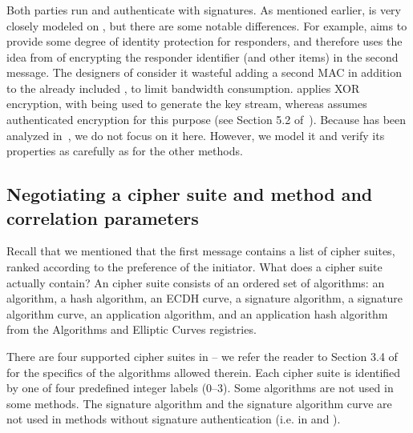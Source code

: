 \subsubsection{\mSigSig}
Both parties run \mSig{} and authenticate with signatures.
%
As mentioned earlier, \mSigSig{} is very closely modeled on \mSigmaI{}, but
there are some notable differences.
%
For example, \mEdhoc{} aims to provide some degree of identity protection for
responders, and therefore uses the idea from \mSigmaI{} of encrypting the
responder identifier \mIdcredr{} (and other items) in the second message.
%
The designers of \mEdhoc{} consider it wasteful adding a second MAC in addition
to the already included \mMactwo{}, to limit bandwidth consumption.
%
\mEdhoc{} applies XOR encryption, with \mHkdf{} being used to generate the
key stream, whereas \mSigma{} assumes authenticated encryption for this
purpose (see Section 5.2 of~\cite{sigma}).
%
Because \mSigSig{} has been analyzed in~\cite{DBLP:conf/secsr/BruniJPS18}, we
do not focus on it here.
%
However, we model it and verify its properties as carefully as for the other methods.


\subsection{Negotiating a cipher suite and method and correlation parameters}
\label{sec:ciphersuite}
Recall that we mentioned that the first message contains a list of cipher suites, ranked according to the preference of the initiator. What does a cipher suite actually contain? An \mEdhoc{} cipher suite consists of an ordered set of \mCose{} algorithms: an \mAead{} algorithm, a hash algorithm, an ECDH curve, a signature algorithm, a signature algorithm curve, an application \mAead{} algorithm, and an application hash algorithm from the \mCose{} Algorithms and Elliptic Curves registries.  

There are four supported cipher suites in \mEdhoc{} -- we refer the reader to Section 3.4 of~\cite{selander-lake-edhoc-01} for the specifics of the algorithms allowed therein. Each cipher suite is identified by one of four predefined integer labels (0--3). Some algorithms are not used in some methods.  The signature algorithm and the signature algorithm curve are not used in methods without signature authentication (i.e. in \mPskPsk{} and \mStatStat).

